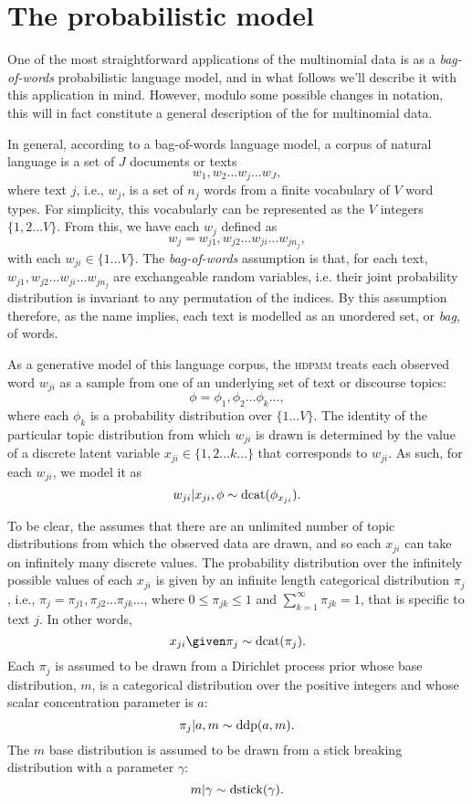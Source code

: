 \section{The probabilistic model}

One of the most straightforward applications of the multinomial data \hdpmm is
as a \emph{bag-of-words} probabilistic language model, and in what follows
we'll describe it with this application in mind. However, modulo some possible
changes in notation, this will in fact constitute a general description of the
\hdpmm for multinomial data.

In general, according to a bag-of-words language model, a corpus of natural
language is a set of $J$ documents or texts \[w_1, w_2 \ldots w_j \ldots w_J,\]
where text $j$, i.e., $w_j$, is a set of $n_j$ words from a finite vocabulary
of $V$ word types. For simplicity, this vocabularly can be represented as the
$V$ integers $\{1, 2 \ldots V\}$.  From this, we have each $w_j$ defined as
\[w_j = w_{j1}, w_{j2} \ldots w_{ji} \ldots w_{jn_j},\] with each $w_{ji} \in
\{1 \ldots V\}$.  The \emph{bag-of-words} assumption is that, for each text,
$w_{j1}, w_{j2} \ldots w_{ji} \ldots w_{jn_j}$ are exchangeable random
variables, i.e.  their joint probability distribution is invariant to any
permutation of the indices.  By this assumption therefore, as the name implies,
each text is modelled as an unordered set, or \emph{bag}, of words.

As a generative model of this language corpus, the \textsc{hdpmm} treats each
observed word $w_{ji}$ as a sample from one of an underlying set of text or
discourse topics: \[ \phi = \phi_1, \phi_2 \ldots \phi_k \ldots, \] where each
$\phi_k$ is a probability distribution over $\{1 \ldots V\}$.  The identity of
the particular topic distribution from which $w_{ji}$ is drawn is determined by
the value of a discrete latent variable $x_{ji} \in \{1, 2 \ldots k \ldots\}$
that corresponds to $w_{ji}$. As such, for each $w_{ji}$, we model it as
\[w_{ji}\vert x_{ji}, \phi \sim \mathrm{dcat}(\phi_{x_{ji}}).\] 

To be clear, the \hdpmm assumes that there are an unlimited number of topic
distributions from which the observed data are drawn, and so each $x_{ji}$ can
take on infinitely many discrete values.  The probability distribution over the
infinitely possible values of each $x_{ji}$ is given by an infinite length
categorical distribution $\pi_j$, i.e., $\pi_j = \pi_{j1}, \pi_{j2} \ldots
\pi_{jk} \ldots$, where $0 \leq \pi_{jk} \leq 1$ and $\sum_{k=1}^\infty
\pi_{jk} = 1$, that is specific to text $j$.  In other words, \[x_{ji} \given
\pi_j \sim \dcat{\pi_j}.\] Each $\pi_j$ is assumed to be drawn from a Dirichlet
process prior whose base distribution, $m$, is a categorical distribution over
the positive integers and whose scalar concentration parameter is $a$: 
\[\pi_j\vert a,m \sim \mathrm{ddp}(a,m).\]
The $m$ base distribution is assumed to be drawn from a stick breaking
distribution with a parameter $\gamma$: \[ m\vert\gamma \sim \mathrm{dstick}(\gamma).
\]

